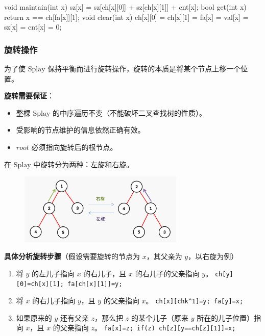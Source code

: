 \begin{cppcode}
void maintain(int x) { sz[x] = sz[ch[x][0]] + sz[ch[x][1]] + cnt[x]; }
bool get(int x) { return x == ch[fa[x]][1]; }
void clear(int x) { ch[x][0] = ch[x][1] = fa[x] = val[x] = sz[x] = cnt[x] = 0; }
\end{cppcode}

\subsubsection{旋转操作}

为了使 $\text{Splay}$ 保持平衡而进行旋转操作，旋转的本质是将某个节点上移一个位置。

\textbf{旋转需要保证}：

\begin{itemize}
\item 整棵 $\text{Splay}$ 的中序遍历不变（不能破坏二叉查找树的性质）。
\item 受影响的节点维护的信息依然正确有效。
\item $root$ 必须指向旋转后的根节点。
\end{itemize}

在 $\text{Splay}$ 中旋转分为两种：左旋和右旋。

\begin{figure}[htbp]
\centering
\includegraphics[width=0.7\textwidth]{docs/ds/images/splay2.png} 

\end{figure}

\textbf{具体分析旋转步骤}（假设需要旋转的节点为 $x$，其父亲为 $y$，以右旋为例）

\begin{enumerate}
\item 将 $y$ 的左儿子指向 $x$ 的右儿子，且 $x$ 的右儿子的父亲指向 $y$。
\texttt{ch[y][0]=ch[x][1]; fa[ch[x][1]]=y;}
\item 将 $x$ 的右儿子指向 $y$，且 $y$ 的父亲指向 $x$。
\texttt{ch[x][chk\textasciicircum{}1]=y; fa[y]=x;}
\item 如果原来的 $y$ 还有父亲 $z$，那么把 $z$ 的某个儿子（原来 $y$ 所在的儿子位置）指向 $x$，且 $x$ 的父亲指向 $z$。
\texttt{fa[x]=z; if(z) ch[z][y==ch[z][1]]=x;}
\end{enumerate}

